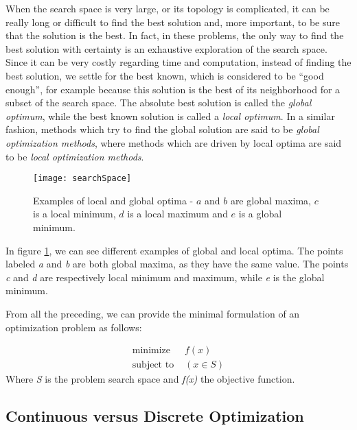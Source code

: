 When the search space is very large, or its topology is complicated, it can be really long or difficult to find the best solution and, more important, to be sure that the solution is the best. In fact, in these problems, the only way to find the best solution with certainty is an exhaustive exploration of the search space. Since it can be very costly regarding time and computation, instead of finding the best solution, we settle for the best known, which is considered to be \enquote{good enough}, for example because this solution is the best of its neighborhood for a subset of the search space. The absolute best solution is called the \emph{global optimum}, while the best known solution is called a \emph{local optimum}. In a similar fashion, methods which try to find the global solution are said to be \emph{global optimization methods}, where methods which are driven by local optima are said to be \emph{local optimization methods}.


\begin{figure}
\centering
\texttt{[image: searchSpace]}
\caption{Examples of local and global optima - $a$ and $b$ are global maxima, $c$ is a local minimum, $d$ is a local maximum and $e$ is a global minimum.}
\label{localAndGlobalOptims}
\end{figure}

In figure \ref{localAndGlobalOptims}, we can see different examples of global and local optima. The points labeled \emph{a} and \emph{b} are both global maxima, as they have the same value. The points
\emph{c} and \emph{d} are respectively local minimum and maximum, while \emph{e} is the global minimum.

From all the preceding, we can provide the minimal formulation of an optimization problem as follows:

\begin{align*}
\text{minimize } &f(x) \\
\text{subject to } &(x \in S)
\end{align*}
Where \emph{S} is the problem search space and \emph{f(x)} the objective function.

\subsection{Continuous versus Discrete Optimization}

